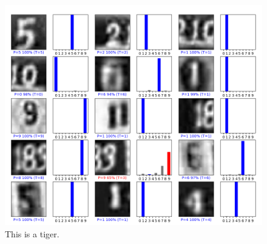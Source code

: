 \documentclass{article}
\begin{document}
\begin{figure}[h]
  \includegraphics[width=\textwidth]{results.png}
  \caption{This is a tiger.}
\end{figure}
\end{document}

